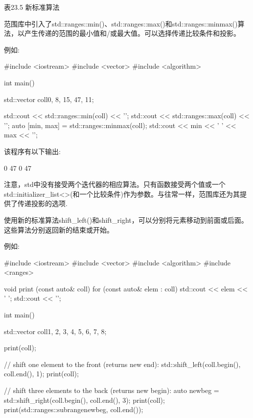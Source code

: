 \begin{center}
表23.5 新标准算法
\end{center}


范围库中引入了std::ranges::min()、std::ranges::max()和std::ranges::minmax()算法，以产生传递的范围的最小值和/或最大值。可以选择传递比较条件和投影。

例如:


\begin{cpp}
#include <iostream>
#include <vector>
#include <algorithm>

int main()
{
	std::vector coll{0, 8, 15, 47, 11};
	
	std::cout << std::ranges::min(coll) << '\n';
	std::cout << std::ranges::max(coll) << '\n';
	auto [min, max] = std::ranges::minmax(coll);
	std::cout << min << ' ' << max << '\n';
}
\end{cpp}

该程序有以下输出:

\begin{shell}
0
47
0 47
\end{shell}

注意，std中没有接受两个迭代器的相应算法。只有函数接受两个值或一个std::initializer\_list<>(和一个比较条件)作为参数。与往常一样，范围库还为其提供了传递投影的选项.


使用新的标准算法shift\_left()和shift\_right，可以分别将元素移动到前面或后面。这些算法分别返回新的结束或开始。

例如:


\begin{cpp}
#include <iostream>
#include <vector>
#include <algorithm>
#include <ranges>

void print (const auto& coll)
{
	for (const auto& elem : coll) {
		std::cout << elem << ' ';
	}
	std::cout << '\n';
}

int main()
{
	std::vector coll{1, 2, 3, 4, 5, 6, 7, 8};
	
	print(coll);
	
	// shift one element to the front (returns new end):
	std::shift_left(coll.begin(), coll.end(), 1);
	print(coll);
	
	// shift three elements to the back (returns new begin):
	auto newbeg = std::shift_right(coll.begin(), coll.end(), 3);
	print(coll);
	print(std::ranges::subrange{newbeg, coll.end()});
}
\end{cpp}

